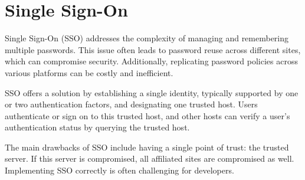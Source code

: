 \section{Single Sign-On}

Single Sign-On (SSO) addresses the complexity of managing and remembering multiple passwords. 
This issue often leads to password reuse across different sites, which can compromise security. 
Additionally, replicating password policies across various platforms can be costly and inefficient.

SSO offers a solution by establishing a single identity, typically supported by one or two authentication factors, and designating one trusted host. 
Users authenticate or sign on to this trusted host, and other hosts can verify a user's authentication status by querying the trusted host. 

The main drawbacks of SSO include having a single point of trust: the trusted server. 
If this server is compromised, all affiliated sites are compromised as well. 
Implementing SSO correctly is often challenging for developers. 